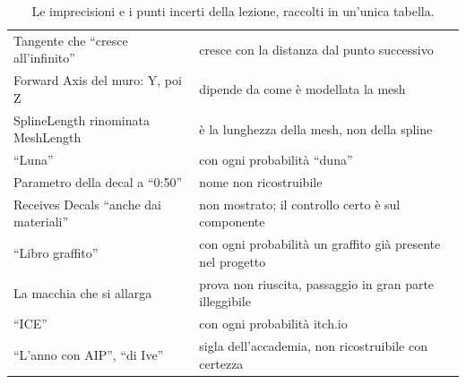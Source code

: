 \begin{table}[htbp]
\begin{tabular}{@{}p{4.8cm}p{9.2cm}@{}}
Tangente che ``cresce all'infinito'' & cresce con la distanza dal punto successivo \\
Forward Axis del muro: Y, poi Z & dipende da come è modellata la mesh \\
SplineLength rinominata MeshLength & è la lunghezza della mesh, non della spline \\
``Luna'' & con ogni probabilità ``duna'' \\
Parametro della decal a ``0:50'' & nome non ricostruibile \\
Receives Decals ``anche dai materiali'' & non mostrato; il controllo certo è sul componente \\
``Libro graffito'' & con ogni probabilità un graffito già presente nel progetto \\
La macchia che si allarga & prova non riuscita, passaggio in gran parte illeggibile \\
``ICE'' & con ogni probabilità itch.io \\
``L'anno con AIP'', ``di Ive'' & sigla dell'accademia, non ricostruibile con certezza \\
\bottomrule
\end{tabular}
\caption{Le imprecisioni e i punti incerti della lezione, raccolti in un'unica tabella.}
\label{ue16:tab:imprecisioni}
\end{table}

